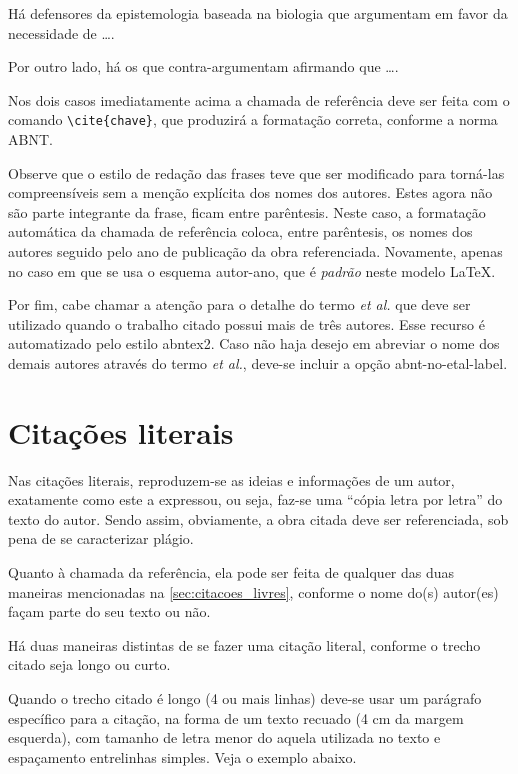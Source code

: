 \begin{apendicesenv}
Há defensores da epistemologia baseada na biologia que argumentam em favor da necessidade de \ldots \cite{Maturana2003}.

Por outro lado, há os que contra-argumentam afirmando que \ldots  \cite{Barbosa2004}.

Nos dois casos imediatamente acima a chamada de referência deve ser feita com o comando \verb|\cite{chave}|, que produzirá a formatação correta, conforme a norma ABNT.

Observe que o estilo de redação das frases teve que ser modificado para torná-las compreensíveis sem a menção explícita dos nomes dos autores. Estes agora não são parte integrante da frase, ficam entre parêntesis. Neste caso, a formatação automática da chamada de referência coloca, entre parêntesis, os nomes dos autores seguido pelo ano de publicação da obra referenciada. Novamente, apenas no caso em que se usa o esquema autor-ano, que é \textit{padrão} neste modelo \LaTeX{}.

Por fim, cabe chamar a atenção para o detalhe do termo \textit{et al.} que deve ser utilizado quando o trabalho citado possui mais de três autores. Esse recurso é automatizado pelo estilo {\ttfamily abntex2}. Caso não haja desejo em abreviar o nome dos demais autores através do termo \textit{et al.}, deve-se incluir a opção {\ttfamily abnt-no-etal-label}.

\section{Citações literais}
\label{sec:citacoes_literais}

Nas citações literais, reproduzem-se as ideias e informações de um autor, exatamente como este a expressou, ou seja, faz-se uma ``cópia letra por letra'' do texto do autor. Sendo assim, obviamente, a obra citada deve ser referenciada, sob pena de se caracterizar plágio.

Quanto à chamada da referência, ela pode ser feita de qualquer das duas maneiras mencionadas na \autoref{sec:citacoes_livres}, conforme o nome do(s) autor(es) façam parte do seu texto ou não.

Há duas maneiras distintas de se fazer uma citação literal, conforme o trecho citado seja longo ou curto.

Quando o trecho citado é longo (4 ou mais linhas) deve-se usar um parágrafo específico para a citação, na forma de um texto recuado (4 cm da margem esquerda), com tamanho de letra menor do aquela utilizada no texto e espaçamento entrelinhas simples. Veja o exemplo abaixo.


\end{apendicesenv}
